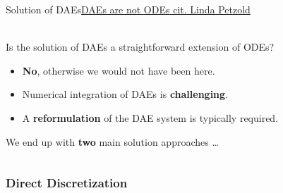 \begin{frame}{Solution of \aclp{DAE}}{\underline{\acp{DAE} are not \acp{ODE} cit. Linda Petzold}}
  \vspace{-1.5cm}\hspace{4.25cm} \\[1.0em]

  Is the solution of \acp{DAE} a straightforward extension of \acp{ODE}?
  \begin{itemize}
    \item \textbf{No}, otherwise we would not have been here.
    \item Numerical integration of \acp{DAE} is \textbf{challenging}.
    \item A \textbf{reformulation} of the \ac{DAE} system is typically required.
  \end{itemize}
  \vspace{1.0em}
  We end up with \textbf{two} main solution approaches \dots
  \vspace{1.5em}
  \begin{columns}
    \begin{column}[t]{0.5\textwidth}
      \centering
    \end{column}
    \begin{column}[t]{0.5\textwidth}
      \centering
    \end{column}
  \end{columns}
  \vspace{1.5em}
\end{frame}

\subsubsection{Direct Discretization}

